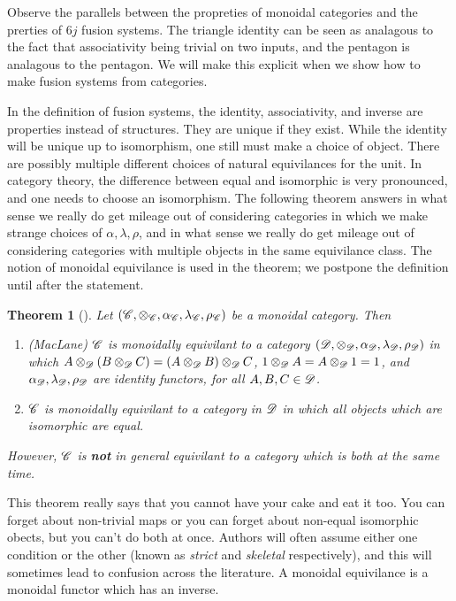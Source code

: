 \documentclass{article}
\newtheorem{theorem}{Theorem}[section]
\theoremstyle{definition}
\numberwithin{figure}{section}
\begin{document}
Observe the parallels between the propreties of monoidal categories and the prerties of $6j$ fusion systems. The triangle identity can be seen as analagous to the fact that associativity being trivial on two inputs, and the pentagon is analagous to the pentagon. We will make this explicit when we show how to make fusion systems from categories.

In the definition of fusion systems, the identity, associativity, and inverse are properties instead of structures. They are unique if they exist. While the identity will be unique up to isomorphism, one still must make a choice of object. There are possibly multiple different choices of natural equivilances for the unit. In category theory, the difference between equal and isomorphic is very pronounced, and one needs to choose an isomorphism. The following theorem answers in what sense we really do get mileage out of considering categories in which we make strange choices of $\alpha,\lambda,\rho$, and in what sense we really do get mileage out of considering categories with multiple objects in the same equivilance class. The notion of monoidal equivilance is used in the theorem; we postpone the definition until after the statement.

\begin{theorem}[\cite{hagge2007some}] Let $(\mathscr{C},\otimes_{\mathscr{C}},\alpha_{\mathscr{C}},\lambda_{\mathscr{C}},\rho_{\mathscr{C}})$ be a monoidal category. Then

\begin{enumerate}
\item (MacLane)  $\mathscr{C}$ is monoidally equivilant to a category $(\mathscr{D},\otimes_{\mathscr{D}},\alpha_{\mathscr{D}},\lambda_{\mathscr{D}},\rho_{\mathscr{D}})$ in which $A\otimes_{\mathscr{D}} (B\otimes_{\mathscr{D}} C)=(A\otimes_{\mathscr{D}} B)\otimes_{\mathscr{D}} C$, $1\otimes_{\mathscr{D}} A=A\otimes_{\mathscr{D}} 1=1$, and $\alpha_{\mathscr{D}},\lambda_{\mathscr{D}},\rho_{\mathscr{D}}$ are identity functors, for all $A,B,C\in \mathscr{D}$. 
\item $\mathscr{C}$ is monoidally equivilant to a category in $\mathscr{D}$ in which all objects which are isomorphic are equal.
\end{enumerate}

However, $\mathscr{C}$ is \textbf{not} in general equivilant to a category which is both at the same time.
\end{theorem}

This theorem really says that you cannot have your cake and eat it too. You can forget about non-trivial maps or you can forget about non-equal isomorphic obects, but you can't do both at once. Authors will often assume either one condition or the other (known as \textit{strict} and \textit{skeletal} respectively), and this will sometimes lead to confusion across the literature. A monoidal equivilance is a monoidal functor which has an inverse.
\end{document}
